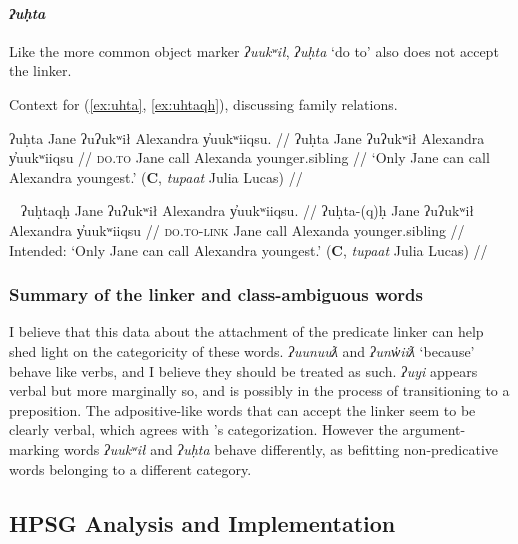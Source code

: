 \paragraph{\textit{ʔuḥta}} \label{sec:link:uhta} Like the more common object marker \textit{ʔuukʷił}, \textit{ʔuḥta} `do to' also does not accept the linker.

\vspace{5pt}

\noindent Context for (\ref{ex:uhta}, \ref{ex:uhtaqh}), discussing family relations.

\ex \label{ex:uhta}
\begingl
\glpreamble ʔuḥta Jane ʔuʔukʷił Alexandra y̓uukʷiiqsu. //
\gla ʔuḥta Jane ʔuʔukʷił Alexandra y̓uukʷiiqsu //
\glb \textsc{do.to} Jane call Alexanda younger.sibling //
\glft `Only Jane can call Alexandra youngest.' (\textbf{C}, \textit{tupaat} Julia Lucas) //
\endgl
\xe

\ex~ \label{ex:uhtaqh}
\begingl
\glpreamble *ʔuḥtaqḥ Jane ʔuʔukʷił Alexandra y̓uukʷiiqsu. //
\gla ʔuḥta-(q)ḥ Jane ʔuʔukʷił Alexandra y̓uukʷiiqsu //
\glb \textsc{do.to}-\textsc{link} Jane call Alexanda younger.sibling //
\glft Intended: `Only Jane can call Alexandra youngest.' (\textbf{C}, \textit{tupaat} Julia Lucas) //
\endgl
\xe

\subsubsection{Summary of the linker and class-ambiguous words}

I believe that this data about the attachment of the predicate linker can help shed light on the categoricity of these words. \textit{ʔuunuuƛ} and \textit{ʔunw̓iiƛ} `because' behave like verbs, and I believe they should be treated as such. \textit{ʔuyi} appears verbal but more marginally so, and is possibly in the process of transitioning to a preposition. The adpositive-like words that can accept the linker seem to be clearly verbal, which agrees with \cite{woo2007b}'s categorization. However the argument-marking words \textit{ʔuukʷił} and \textit{ʔuḥta} behave differently, as befitting non-predicative words belonging to a different category.

\subsection{HPSG Analysis and Implementation} \label{sec:link:analysis}

